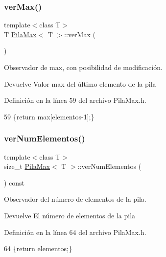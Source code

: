 \subsubsection{\texorpdfstring{ver\+Max()}{verMax()}}
{\footnotesize\ttfamily template$<$class T$>$ \\
T \mbox{\hyperlink{classPilaMax}{Pila\+Max}}$<$ T $>$\+::ver\+Max (\begin{DoxyParamCaption}{ }\end{DoxyParamCaption})\hspace{0.3cm}{\ttfamily [inline]}}



Observador de max, con posibilidad de modificación. 

\begin{DoxyReturn}{Devuelve}
Valor max del último elemento de la pila 
\end{DoxyReturn}


Definición en la línea 59 del archivo Pila\+Max.\+h.


\begin{DoxyCode}
59 \{\textcolor{keywordflow}{return} max[elementos-1];\}
\end{DoxyCode}
\mbox{\label{classPilaMax_aed2d236773d9232ceda548339bfe60b7}} 
\subsubsection{\texorpdfstring{ver\+Num\+Elementos()}{verNumElementos()}}
{\footnotesize\ttfamily template$<$class T$>$ \\
size\+\_\+t \mbox{\hyperlink{classPilaMax}{Pila\+Max}}$<$ T $>$\+::ver\+Num\+Elementos (\begin{DoxyParamCaption}{ }\end{DoxyParamCaption}) const\hspace{0.3cm}{\ttfamily [inline]}}



Observador del número de elementos de la pila. 

\begin{DoxyReturn}{Devuelve}
El número de elementos de la pila 
\end{DoxyReturn}


Definición en la línea 64 del archivo Pila\+Max.\+h.


\begin{DoxyCode}
64 \{\textcolor{keywordflow}{return} elementos;\}
\end{DoxyCode}
\mbox{\label{classPilaMax_a106ddeebac120bce70bf95ffd59ebfc7}} 
